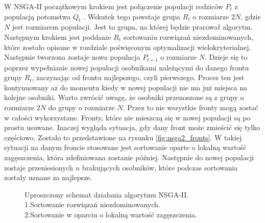 \documentclass[twoside]{iisthesis}
\begin{document}
W NSGA-II początkowym krokiem jest połączenie populacji rodziców $P_{t}$ z populacją potomstwa $Q_{t}$ \cite{nsga}. Wskutek tego powstaje grupa $R_{t}$ o rozmiarze $2N$, gdzie $N$ jest rozmiarem populacji. Jest to grupa, na której będzie pracował algorytm. Następnym krokiem jest poddanie $R_{t}$ sortowaniu rozwiązań niezdominowanych, które zostało opisane w rozdziale poświęconym optymalizacji wielokryterialnej. Następnie tworzona zostaje nowa populacja $P_{t+1}$ o rozmiarze $N$. Dzieje się to poprzez wypełnianie nowej populacji osobnikami należącymi do danego frontu grupy $R_{t}$, zaczynając od frontu najlepszego, czyli pierwszego. Proces ten jest kontynuowany aż do momentu kiedy w nowej populacji nie ma już miejsca na kolejne osobniki. Warto zwrócić uwagę, że osobniki przenoszone są z grupy o rozmiarze $2N$ do grupy o rozmiarze $N$. Przez to nie wszystkie fronty mogą zostać w całości wykorzystane. Fronty, które nie mieszczą się w nowej populacji są po prostu usuwane. Inaczej wygląda sytuacja, gdy dany front może zmieścić się tylko częściowo. Zostało to przedstawione na rysunku \eqref{fig:nsga2_fronts}. W takiej sytuacji na danym froncie stosowane jest sortowanie oparte o lokalną wartość zagęszczenia, która zdefiniowana zostanie później. Następnie do nowej populacji zostaje przeniesionych $n$ brakujących osobników, które podczas sortowania zostały uznane za najlepsze.
\begin{figure}[!htb]
	\centering
	\caption{Uproszczony schemat działania algorytmu NSGA-II.\\1.Sortowanie rozwiązań niezdominowanych.\\2.Sortowanie w oparciu o lokalną wartość zagęszczenia.}
	\label{fig:nsga2_fronts}
\end{figure}
\end{document}
